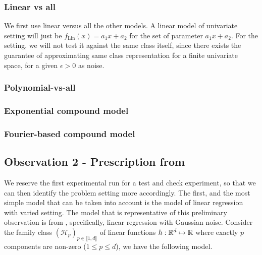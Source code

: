 \documentclass{article}
\begin{document}
\subsubsection{Linear vs all}
We first use linear versus all the other models. A linear model of univariate setting will just be $f_{\mathrm{Lin}}(x)=a_{1}x+a_{2}$ for the set of parameter $a_{1}x+a_{2}$. For the setting, we will not test it against the same class itself, since there exists the guarantee of approximating same class representation for a finite univariate space, for a given $\epsilon > 0$ as noise. 


\subsubsection{Polynomial-vs-all}

\subsubsection{Exponential compound model}

\subsubsection{Fourier-based compound model}

\subsection{Observation 2 - Prescription from \cite{lafon_understanding_2024}}
We reserve the first experimental run for a test and check experiment, so that we can then identify the problem setting more accordingly. The first, and the most simple model that can be taken into account is the model of linear regression with varied setting. The model that is representative of this preliminary observation is from \cite{lafon_understanding_2024}, specifically, linear regression with Gaussian noise. Consider the family class $(\mathcal{H}_p)_{p\in\llbracket1,d\rrbracket}$ of linear functions $h:\mathbb{R}^d\mapsto \mathbb{R}$ where exactly $p$ components are non-zero ($1\leq p\leq d$), we have the following model. 
\end{document}
